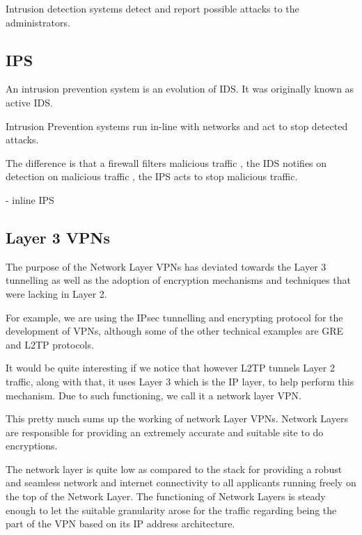 Intrusion detection systems detect and report possible attacks to the
administrators.

\subsectionend

\subsection{IPS}
\label{ssec:ips}

An intrusion prevention system is an evolution of IDS. It was originally known
as active IDS.

Intrusion Prevention systems run in-line with networks and act to stop detected
attacks.

The difference is that a firewall filters malicious traffic , the IDS notifies
on detection on malicious traffic , the IPS acts to stop malicious traffic.

- inline IPS


\subsectionend

\subsection{Layer 3 VPNs}
\label{ssec:layer_3_vpns}
The purpose of the Network Layer VPNs has deviated towards the Layer 3 tunnelling as well as the adoption of encryption mechanisms and techniques that were lacking in Layer 2.

For example, we are using the IPsec tunnelling and encrypting protocol for the development of VPNs, although some of the other technical examples are GRE and L2TP protocols.

It would be quite interesting if we notice that however L2TP tunnels Layer 2 traffic, along with that, it uses Layer 3 which is the IP layer, to help perform this mechanism. Due to such functioning, we call it a network layer VPN.

This pretty much sums up the working of network Layer VPNs. Network Layers are responsible for providing an extremely accurate and suitable site to do encryptions.

The network layer is quite low as compared to the stack for providing a robust and seamless network and internet connectivity to all applicants running freely on the top of the Network Layer. The functioning of Network Layers is steady enough to let the suitable granularity arose for the traffic regarding being the part of the VPN based on its IP address architecture.

